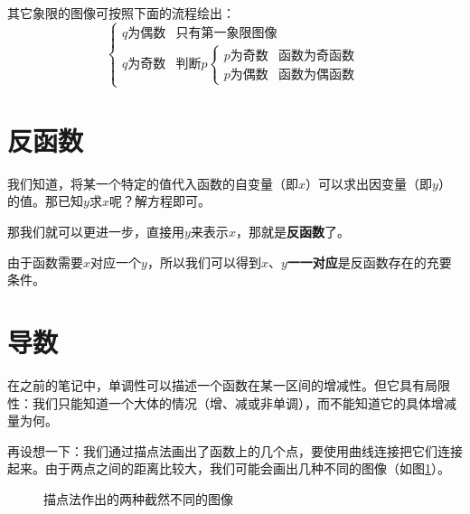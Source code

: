 其它象限的图像可按照下面的流程绘出：
\[\begin{cases}
	\text{$q$为偶数} & \text{只有第一象限图像} \\
	\text{$q$为奇数} & \text{判断$p$}
	\begin{cases}
		\text{$p$为奇数} & \text{函数为奇函数} \\
		\text{$p$为偶数} & \text{函数为偶函数}
	\end{cases}
\end{cases}\]

\section{反函数}
我们知道，将某一个特定的值代入函数的自变量（即$x$）可以求出因变量（即$y$）的值。那已知$y$求$x$呢？解方程即可。

那我们就可以更进一步，直接用$y$来表示$x$，那就是\textbf{反函数}了。

由于函数需要$x$对应一个$y$，所以我们可以得到$x$、$y$\textbf{一一对应}是反函数存在的充要条件。

\section{导数}
在之前的笔记中，单调性可以描述一个函数在某一区间的增减性。但它具有局限性：我们只能知道一个大体的情况（增、减或非单调），而不能知道它的具体增减量为何。

再设想一下：我们通过描点法画出了函数上的几个点，要使用曲线连接把它们连接起来。由于两点之间的距离比较大，我们可能会画出几种不同的图像（如图\ref{fig:two-different-function-figure}）。

\begin{figure}[htb]
    \centering
    \caption{描点法作出的两种截然不同的图像}
    \label{fig:two-different-function-figure}
\end{figure}

